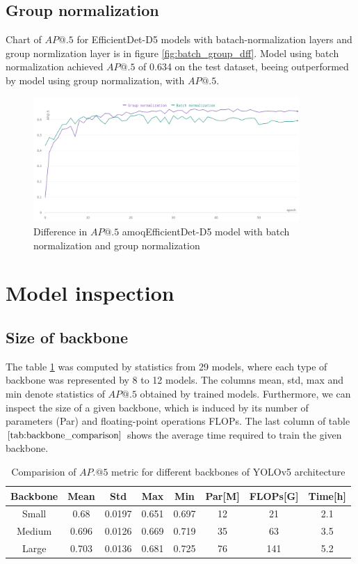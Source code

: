 \subsection{Group normalization}
Chart of $AP@.5$ for EfficientDet-D5 models with batach-normalization layers and group normlization layer is in figure \ref{fig:batch_group_dff}. Model using batch normalization achieved $AP@.5$ of 0.634 on the test dataset, beeing outperformed by model using group normalization, with $AP@.5$.
\begin{figure}[H]
    \centering
    \includegraphics[width=0.9\textwidth]{images/batch_norm_group_norm.png}
    \caption{Difference in $AP@.5$ amoqEfficientDet-D5 model with batch normalization and group normalization}
    \label{fig:batch_group_diff}
\end{figure}

\section{Model inspection}
\label{sec:model_inspection_results}
\subsection{Size of backbone}
The table \ref{tab:backbone_comparison} was computed by statistics from 29 models, where each type of backbone was represented by 8 to 12 models. The columns mean, std, max and min denote statistics of $AP@.5$ obtained by trained models. Furthermore, we can inspect the size of a given backbone, which is induced by its number of parameters (Par) and floating-point operations FLOPs. The last column of table $\ref{tab:backbone_comparison}$ shows the average time required to train the given backbone.
\begin{table}[H]
    \begin{tabular}{|c|c|c|c|c|c|c|c|}
        \hline
        Backbone & Mean  & Std    & Max   & Min   & Par[M] & FLOPs[G] & Time[h] \\ \hline
        Small    & 0.68  & 0.0197 & 0.651 & 0.697 & 12     & 21       & 2.1     \\ \hline
        Medium   & 0.696 & 0.0126 & 0.669 & 0.719 & 35     & 63       & 3.5     \\ \hline
        Large    & 0.703 & 0.0136 & 0.681 & 0.725 & 76     & 141      & 5.2     \\ \hline
    \end{tabular}
    \caption{Comparision of $AP.@5$ metric for different backbones of YOLOv5 architecture}
    \label{tab:backbone_comparison}
\end{table}

